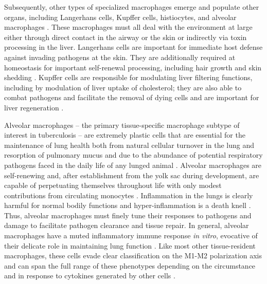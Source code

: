 Subsequently, other types of specialized macrophages emerge and populate other organs, including Langerhans cells, Kupffer cells, histiocytes, and alveolar macrophages \citep{Gordon2017, Davies2013a, Wynn2013, Lavin2015}. These macrophages must all deal with the environment at large either through direct contact in the airway or the skin or indirectly via toxin processing in the liver. Langerhans cells are important for immediate host defense against invading pathogens at the skin. They are additionally required at homeostasis for important self\hyp{}renewal processing, including hair growth and skin shedding \citep{Merad2008, Theret2019}. Kupffer cells are responsible for modulating liver filtering functions, including by modulation of liver uptake of cholesterol; they are also able to combat pathogens and facilitate the removal of dying cells and are important for liver regeneration \citep{Demetz2020, Theret2019}. 

Alveolar macrophages -- the primary tissue\hyp{}specific macrophage subtype of interest in tuberculosis -- are extremely plastic cells that are essential for the maintenance of lung health both from natural cellular turnover in the lung and resorption of pulmonary mucus and due to the abundance of potential respiratory pathogens faced in the daily life of any lunged animal \citep{Hussell2014}. Alveolar macrophages are self\hyp{}renewing and, after establishment from the yolk sac during development, are capable of perpetuating themselves throughout life with only modest contributions from circulating monocytes \citep{Hashimoto2013, Yona2013, Varol2015}. Inflammation in the lungs is clearly harmful for normal bodily functions and hyper\hyp{}inflammation is a death knell \citep{Kemp2002}. Thus, alveolar macrophages must finely tune their responses to pathogens and damage to facilitate pathogen clearance and tissue repair. In general, alveolar macrophages have a muted inflammatory immune response \textit{in vitro}, evocative of their delicate role in maintaining lung function \citep{Svedberg2019, Joshi2018}. Like most other tissue\hyp{}resident macrophages, these cells evade clear classification on the M1\hyp{}M2 polarization axis and can span the full range of these phenotypes depending on the circumstance and in response to cytokines generated by other cells \citep{Svedberg2019, Hussell2014}. 

